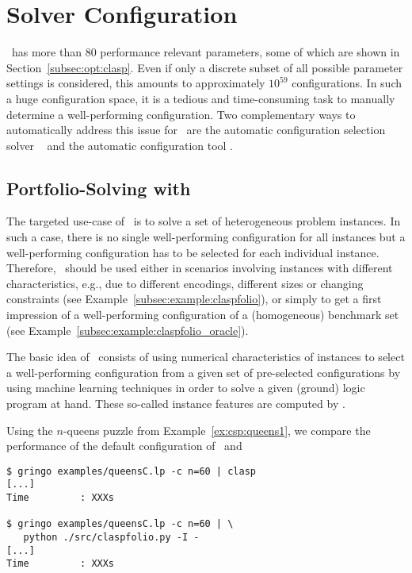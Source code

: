 
\section{Solver Configuration}
\label{sec:configuration}

\clasp\ has more than $80$ performance relevant parameters, some of which are shown in Section~\ref{subsec:opt:clasp}.
Even if only a discrete subset of all possible parameter settings is considered,
this amounts to approximately $10^{59}$ configurations.
In such a huge configuration space, 
it is a tedious and time-consuming task 
to manually determine a well-performing configuration.
Two complementary ways to automatically address this issue for \clasp\ are 
the automatic configuration selection solver \claspfolio~\cite{holisc14a} and 
the automatic configuration tool \piclasp.%

\subsection{Portfolio-Solving with \claspfolio}
\label{sec:claspfolio}

The targeted use-case of \claspfolio\ is to solve a set of heterogeneous problem instances.
In such a case,
there is no single well-performing configuration for all instances
but a well-performing configuration has to be selected for each individual instance.
Therefore, \claspfolio\ should be used either 
in scenarios involving instances with different characteristics, 
e.g., due to different encodings, different sizes or changing constraints 
(see Example~\ref{subsec:example:claspfolio}),
or 
simply to get a first impression of a well-performing configuration of a (homogeneous) benchmark set (see Example~\ref{subsec:example:claspfolio_oracle}). 

The basic idea of \claspfolio\ consists of using numerical characteristics of instances
to select a well-performing configuration from a given set of pre-selected configurations
by using machine learning techniques
in order to solve a given (ground) logic program at hand.
These so-called instance features are computed by \claspre. %
%
\begin{example}\label{subsec:example:claspfolio}
Using the $n$-queens puzzle from Example~\ref{ex:csp:queens1}, 
we compare the performance of the default configuration of \clasp\ 
and \claspfolio{}
\begin{lstlisting}[numbers=none]
$ gringo examples/queensC.lp -c n=60 | clasp
[...]
Time         : XXXs

$ gringo examples/queensC.lp -c n=60 | \
   python ./src/claspfolio.py -I -
[...]
Time         : XXXs
\end{lstlisting}

\end{example}

